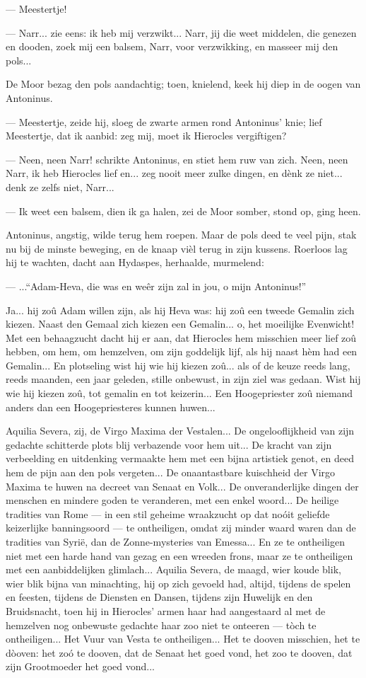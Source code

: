 \documentclass[a4paper, 12pt, oneside, dutch]{article}
\begin{document}
--- Meestertje!

--- Narr... zie eens: ik heb mij verzwikt... Narr, jij die weet middelen, die genezen en dooden, zoek mij een balsem, Narr, voor verzwikking, en masseer mij den pols...

De Moor bezag den pols aandachtig; toen, knielend, keek hij diep in de oogen van Antoninus.

--- Meestertje, zeide hij, sloeg de zwarte armen rond Antoninus' knie; lief Meestertje, dat ik aanbid: zeg mij, moet ik Hierocles vergiftigen?

--- Neen, neen Narr! schrikte Antoninus, en stiet hem ruw van zich. Neen, neen Narr, ik heb Hierocles lief en... zeg nooit meer zulke dingen, en dènk ze niet... denk ze zelfs niet, Narr...

--- Ik weet een balsem, dien ik ga halen, zei de Moor somber, stond op, ging heen.

Antoninus, angstig, wilde terug hem roepen. Maar de pols deed te veel pijn, stak nu bij de minste beweging, en de knaap vièl terug in zijn kussens. Roerloos lag hij te wachten, dacht aan Hydaspes, herhaalde, murmelend:

--- ..."`Adam-Heva, die was en weêr zijn zal in jou, o mijn Antoninus!"'

Ja... hij zoû Adam willen zijn, als hij Heva was: hij zoû een tweede Gemalin zich kiezen. Naast den Gemaal zich kiezen een Gemalin... o, het moeilijke Evenwicht! Met een behaagzucht dacht hij er aan, dat Hierocles hem misschien meer lief zoû hebben, om hem, om hemzelven, om zijn goddelijk lijf, als hij naast hèm had een Gemalin... En plotseling wist hij wie hij kiezen zoû... als of de keuze reeds lang, reeds maanden, een jaar geleden, stille onbewust, in zijn ziel was gedaan. Wist hij wie hij kiezen zoû, tot gemalin en tot keizerin... Een Hoogepriester zoû niemand anders dan een Hoogepriesteres kunnen huwen...

Aquilia Severa, zij, de Virgo Maxima der Vestalen... De ongelooflijkheid van zijn gedachte schitterde plots blij verbazende voor hem uit... De kracht van zijn verbeelding en uitdenking vermaakte hem met een bijna artistiek genot, en deed hem de pijn aan den pols vergeten... De onaantastbare kuischheid der Virgo Maxima te huwen na decreet van Senaat en Volk... De onveranderlijke dingen der menschen en mindere goden te veranderen, met een enkel woord... De heilige tradities van Rome --- in een stil geheime wraakzucht op dat noóit geliefde keizerlijke banningsoord --- te ontheiligen, omdat zij minder waard waren dan de tradities van Syrië, dan de Zonne-mysteries van Emessa... En ze te ontheiligen niet met een harde hand van gezag en een wreeden frons, maar ze te ontheiligen met een aanbiddelijken glimlach... Aquilia Severa, de maagd, wier koude blik, wier blik bijna van minachting, hij op zich gevoeld had, altijd, tijdens de spelen en feesten, tijdens de Diensten en Dansen, tijdens zijn Huwelijk en den Bruidsnacht, toen hij in Hierocles' armen haar had aangestaard al met de hemzelven nog onbewuste gedachte haar zoo niet te onteeren --- tòch te ontheiligen... Het Vuur van Vesta te ontheiligen... Het te dooven misschien, het te dòoven: het zoó te dooven, dat de Senaat het goed vond, het zoo te dooven, dat zijn Grootmoeder het goed vond...
\end{document}
